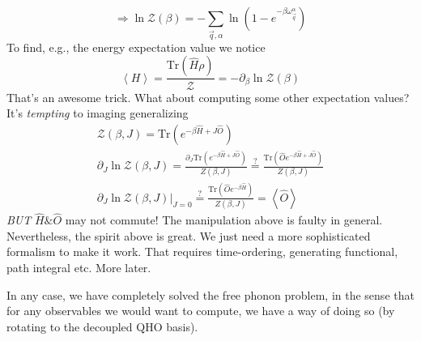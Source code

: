 \[ \Rightarrow \ln \mathcal{Z} \left( \beta \right) =-\sum_{\vec{q},\alpha}{\ln \left( 1-e^{-\beta \omega _{\vec{q}}^{\alpha}} \right)}\]
To find, e.g., the energy expectation value we notice
\[ \left< H \right> =\frac{\mathrm{Tr}\left( \hat{H}\rho \right)}{\mathcal{Z}}=-\partial _{\beta}\ln \mathcal{Z} \left( \beta \right) \]
That's an awesome trick. What about computing some other expectation values? It's \emph{tempting} to imaging generalizing
\begin{gather*}
    \mathcal{Z} \left( \beta ,J \right) =\mathrm{Tr}\left( e^{-\beta \hat{H}+J\hat{O}} \right) \\
    \partial _J\ln \mathcal{Z} \left( \beta ,J \right) =\frac{\partial _J\mathrm{Tr}\left( e^{-\beta \hat{H}+J\hat{O}} \right)}{Z\left( \beta ,J \right)}\stackrel{?}{=}\frac{\mathrm{Tr}\left( \hat{O}e^{-\beta \hat{H}+J\hat{O}} \right)}{Z\left( \beta ,J \right)}\\
    \left. \partial _J\ln \mathcal{Z} \left( \beta ,J \right) \right|_{J=0}\stackrel{?}{=}\frac{\mathrm{Tr}\left( \hat{O}e^{-\beta \hat{H}} \right)}{Z\left( \beta ,J \right)}=\left< \hat{O} \right>
\end{gather*}
\emph{BUT} $\hat{H} \& \hat{O}$ may not commute! The manipulation above is faulty in general. Nevertheless, the spirit above is great. We just need a more sophisticated formalism to make it work. That requires time-ordering, generating functional, path integral etc. More later.

In any case, we have completely solved the free phonon problem, in the sense that for any observables we would want to compute, we have a way of doing so (by rotating to the decoupled QHO basis).

